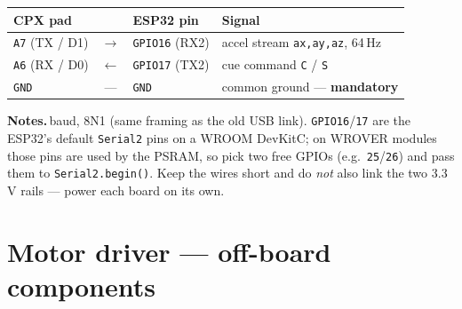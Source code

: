 \documentclass[11pt]{article}
\newcommand{\hdr}[1]{{\color{white}\textbf{#1}}}
\begin{document}
\vspace{4pt}
\renewcommand{\arraystretch}{1.25}
\begin{tabularx}{\textwidth}{l c l L}
  \toprule
  \hdr{CPX pad} & \hdr{} & \hdr{ESP32 pin} & \multicolumn{1}{l}{\hdr{Signal}} \\
  \midrule
  \texttt{A7} (TX / D1) & $\rightarrow$ & \texttt{GPIO16} (RX2) & accel stream \texttt{ax,ay,az}, 64\,Hz \\
  \texttt{A6} (RX / D0) & $\leftarrow$  & \texttt{GPIO17} (TX2) & cue command \texttt{C} / \texttt{S} \\
  \texttt{GND}          & ---           & \texttt{GND}          & common ground --- \textbf{mandatory} \\
  \bottomrule
\end{tabularx}

\vspace{3pt}
{\footnotesize\noindent\textbf{\color{slate}Notes.}\,baud, 8N1 (same framing as the old USB link).
\texttt{GPIO16}/\texttt{17} are the ESP32's default \texttt{Serial2} pins on a WROOM DevKitC; on
WROVER modules those pins are used by the PSRAM, so pick two free GPIOs (e.g.\ \texttt{25}/\texttt{26})
and pass them to \texttt{Serial2.begin()}. Keep the wires short and do \emph{not} also link the two
3.3\,V rails --- power each board on its own.\par}

\section{Motor driver --- off-board components}
\end{document}
